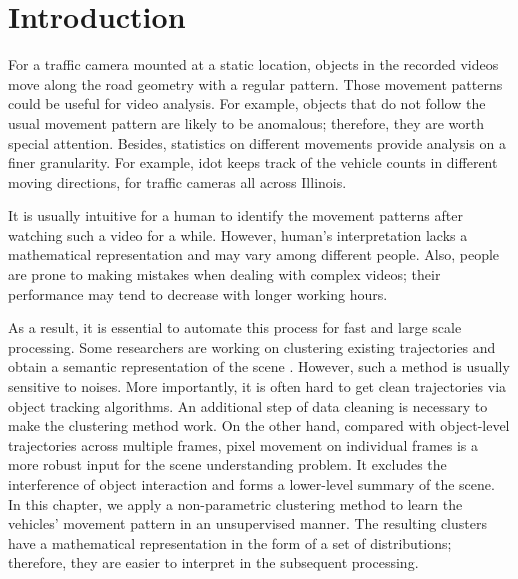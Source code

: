\section{Introduction}
\label{sec:scene-intro}

For a traffic camera mounted at a static location, objects in the recorded videos move along the road geometry with a regular pattern.
Those movement patterns could be useful for video analysis.
For example, objects that do not follow the usual movement pattern are likely to be anomalous; therefore, they are worth special attention.
Besides, statistics on different movements provide analysis on a finer granularity. 
For example, \gls{idot} keeps track of the vehicle counts in different moving directions, for traffic cameras all across Illinois.

It is usually intuitive for a human to identify the movement patterns after watching such a video for a while.
However, human's interpretation lacks a mathematical representation and may vary among different people.
Also, people are prone to making mistakes when dealing with complex videos; their performance may tend to decrease with longer working hours.

As a result, it is essential to automate this process for fast and large scale processing. 
Some researchers are working on clustering existing trajectories and obtain a semantic representation of the scene \cite{tung2011goal,xu2015unsupervised}.
However, such a method is usually sensitive to noises. 
More importantly, it is often hard to get clean trajectories via object tracking algorithms.
An additional step of data cleaning is necessary to make the clustering method work.
On the other hand, compared with object-level trajectories across multiple frames, pixel movement on individual frames is a more robust input for the scene understanding problem.
It excludes the interference of object interaction and forms a lower-level summary of the scene.
In this chapter, we apply a non-parametric clustering method \cite{wang2009unsupervised} to learn the vehicles' movement pattern in an unsupervised manner.
The resulting clusters have a mathematical representation in the form of a set of distributions; therefore, they are easier to interpret in the subsequent processing.